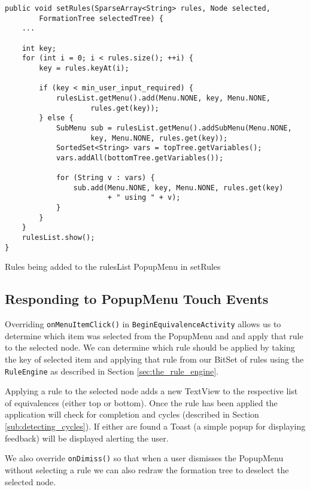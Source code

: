 \documentclass{report}
\begin{document}
\begin{listing}[ht]
\begin{verbatim}
public void setRules(SparseArray<String> rules, Node selected, 
        FormationTree selectedTree) {
    ...

    int key;
    for (int i = 0; i < rules.size(); ++i) {
        key = rules.keyAt(i);

        if (key < min_user_input_required) {
            rulesList.getMenu().add(Menu.NONE, key, Menu.NONE, 
                    rules.get(key));
        } else {
            SubMenu sub = rulesList.getMenu().addSubMenu(Menu.NONE, 
                    key, Menu.NONE, rules.get(key));
            SortedSet<String> vars = topTree.getVariables();
            vars.addAll(bottomTree.getVariables());

            for (String v : vars) {
                sub.add(Menu.NONE, key, Menu.NONE, rules.get(key) 
                        + " using " + v);
            }
        }
    }
    rulesList.show();
}
\end{verbatim}
\caption{Rules being added to the rulesList PopupMenu in setRules}
\label{rulessetup}
\end{listing}

\subsection{Responding to PopupMenu Touch Events}
\label{sub:responding_to_popupmenu_touch_events}

Overriding {\tt onMenuItemClick()} in {\tt BeginEquivalenceActivity} allows us to determine which item was selected from the PopupMenu and and apply that rule to the selected node. We can determine which rule should be applied by taking the key of selected item and applying that rule from our BitSet of rules using the {\tt RuleEngine} as described in Section \ref{sec:the_rule_engine}.

Applying a rule to the selected node adds a new TextView to the respective list of equivalences (either top or bottom). Once the rule has been applied the application will check for completion and cycles (described in Section \ref{sub:detecting_cycles}). If either are found a Toast (a simple popup for displaying feedback) will be displayed alerting the user.

We also override {\tt onDimiss()} so that when a user dismisses the PopupMenu without selecting a rule we can also redraw the formation tree to deselect the selected node. 
\end{document}
